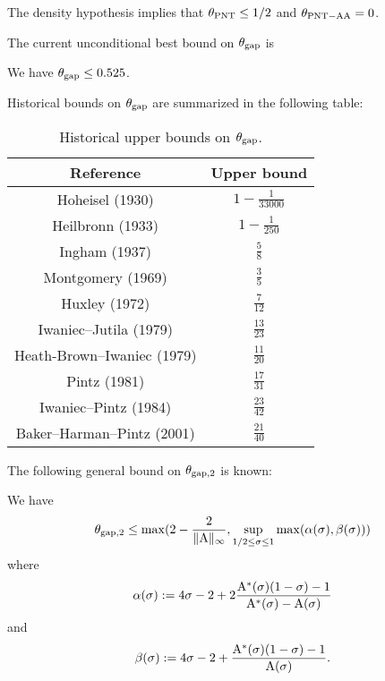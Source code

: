 \begin{corollary}  The density hypothesis implies that $\theta_{\mathrm{PNT}} \leq 1/2$ and $\theta_{\mathrm{PNT-AA}} = 0$.
\end{corollary}

The current unconditional best bound on $\theta_{\mathrm{gap}}$ is

\begin{theorem}\label{bhp-thm}\cite{baker-harman-pintz} We have $\theta_{\mathrm{gap}} \leq 0.525$.
\end{theorem}

Historical bounds on $\theta_{\mathrm{gap}}$ are summarized in the following table:

\begin{table}[ht]
    \caption{Historical upper bounds on $\theta_{\mathrm{gap}}$.}
    \centering
    \renewcommand{\arraystretch}{1.2}
    \begin{tabular}{|c|c|}
    \hline
    Reference & Upper bound \\
    \hline
    Hoheisel (1930) \cite{hoheisel_1930} & $1 - \frac{1}{33000}$ \\
    Heilbronn (1933) \cite{heilbronn_1933} & $1 - \frac{1}{250}$ \\
    Ingham (1937) \cite{ingham_difference_1937} & $\frac{5}{8}$ \\
    Montgomery (1969) \cite{montgomery_1969} & $\frac{3}{5}$ \\
    Huxley (1972) \cite{Huxley} & $\frac{7}{12}$ \\
    Iwaniec--Jutila (1979)\cite{iwaniec-jutila} & $\frac{13}{23}$ \\
    Heath-Brown--Iwaniec (1979) \cite{heathbrown_iwaniec_1979} & $\frac{11}{20}$ \\
    Pintz (1981) \cite{pintz_1981} & $\frac{17}{31}$ \\
    Iwaniec--Pintz (1984) \cite{iwaniec-pintz} & $\frac{23}{42}$\\
    Baker--Harman--Pintz (2001) \cite{baker-harman-pintz} & $\frac{21}{40}$ \\
    \hline
    \end{tabular}
    \end{table}\label{gapmax-table}


The following general bound on $\theta_{\mathrm{gap},2}$ is known:

\begin{proposition}\label{gapsquare-from-a}
    We have
    $$ \theta_{\mathrm{gap},2} \leq \max( 2-\frac{2}{\|\mathrm{A}\|_\infty}, \sup_{1/2 \leq \sigma \leq 1} \max(\alpha(\sigma), \beta(\sigma)))$$
    where
    $$ \alpha(\sigma) := 4\sigma-2 + 2 \frac{\mathrm{A}^*(\sigma)(1-\sigma)-1}{\mathrm{A}^*(\sigma)-\mathrm{A}(\sigma)}$$
    and
    $$ \beta(\sigma) := 4\sigma-2 + \frac{\mathrm{A}^*(\sigma)(1-\sigma)-1}{\mathrm{A}(\sigma)}.$$
\end{proposition}

